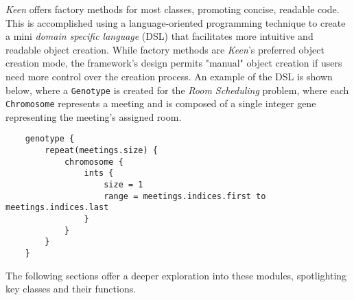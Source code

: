  \textit{Keen} offers factory methods for most classes, promoting concise, 
  readable code.
  This is accomplished using a language-oriented programming technique to 
  create a mini \textit{domain specific language} (DSL) that facilitates more 
  intuitive and readable object creation.
  While factory methods are \textit{Keen}'s preferred object creation mode, the 
  framework's design permits "manual" object creation if users need more 
  control over the creation process.
  An example of the DSL is shown below, where a \texttt{Genotype} is created
  for the \textit{Room Scheduling} problem, where each \texttt{Chromosome}
  represents a meeting and is composed of a single integer gene representing
  the meeting's assigned room.

  \begin{verbatim}
    genotype {
        repeat(meetings.size) {
            chromosome {
                ints { 
                    size = 1
                    range = meetings.indices.first to meetings.indices.last 
                }
            }
        }
    }
  \end{verbatim}
  
  The following sections offer a deeper exploration into these modules, 
  spotlighting key classes and their functions.
